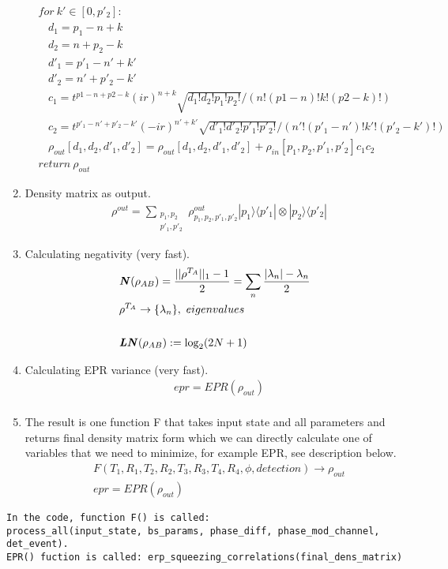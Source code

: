 \documentclass[12pt]{article}
\begin{document}
\begin{enumerate}
\begin{align*}
&   for \ k' \in [0, p'_{2}]: \\
&   \ \ \ \ d_{1} = p_{1} - n + k \\
&   \ \ \ \ d_{2} = n + p_{2} - k \\ 
&   \ \ \ \ d'_{1} = p'_{1} - n' + k' \\ 
&   \ \ \ \ d'_{2} = n' + p'_{2} - k' \\
&   \ \ \ \  c_{1} = t^{p1 - n + p2 - k} (ir)^{n + k} \sqrt{d_{1}! d_{2}! p_{1}! p_{2}!} / (n! (p1 - n)!  k!  (p2 - k)!) \\
&   \ \ \ \  c_{2} = t^{p'_{1} - n' + p'_{2} - k'} (-ir)^{n' + k'} \sqrt{d'_{1}! d'_{2}! p'_{1}! p'_{2}!} / (n'! (p'_{1} - n')! k'! (p'_{2} - k')!) \\
&  \ \ \ \    \rho_{out}[d_{1}, d_{2}, d'_{1}, d'_{2}] = \rho_{out}[d_{1}, d_{2}, d'_{1}, d'_{2}] + \rho_{in}[p_{1}, p_{2}, p'_{1}, p'_{2}]  c_{1} c_{2} \\
& return \ \rho_{out}
\end{align*}


\item Density matrix as output.
\begin{align*}
& \rho^{out} = \sum_{\substack{p_{1},p_{2} \\ p'_{1}, p'_{2}}}  \rho^{out}_{p_{1},p_{2}, p'_{1}, p'_{2}} |p_{1}\rangle \langle p'_{1}| \otimes |p_{2}\rangle \langle p'_{2}|
\end{align*}

\item Calculating negativity (very fast).
\begin{align*}
& \textbf{\textit{N}}(\rho_{AB}) = \frac{||\rho^{T_{A}}||_{1} - 1}{2}  =\sum_{n}  \frac{|\lambda_{n}| - \lambda_{n}}{2} \\
& \rho^{T_{A}}   \rightarrow  \{ \lambda_{n} \}, \ eigenvalues  \\
\\
& \textbf{\textit{LN}}(\rho_{AB}) := \log_{2}(2N + 1) \\
\end{align*}


\item Calculating EPR variance (very fast).
\begin{align*}
& epr = EPR(\rho_{out}) \\
\end{align*}

\item The result is one function F that takes input state and all parameters and returns final density matrix form which we can directly calculate one of variables that we need to minimize, for example EPR, see description below.
\begin{align*}
& F(T_{1}, R_{1}, T_{2}, R_{2}, T_{3}, R_{3}, T_{4}, R_{4}, \phi, detection) \rightarrow \rho_{out} \\
& epr = EPR(\rho_{out})
\end{align*}


\end{enumerate}

\begin{verbatim}
In the code, function F() is called:
process_all(input_state, bs_params, phase_diff, phase_mod_channel, det_event).
EPR() fuction is called: erp_squeezing_correlations(final_dens_matrix)
\end{verbatim}
\end{document}
